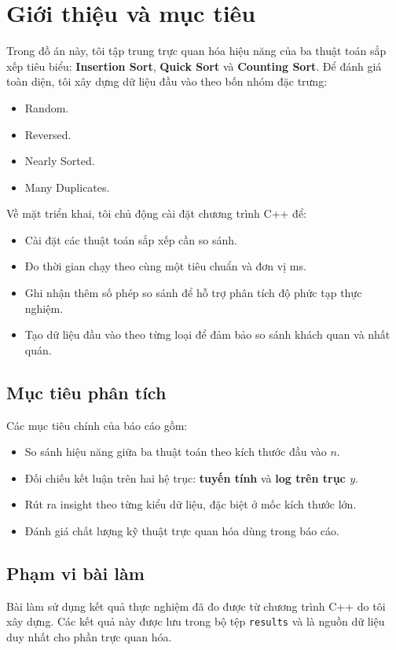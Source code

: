 \section{Giới thiệu và mục tiêu}

Trong đồ án này, tôi tập trung trực quan hóa hiệu năng của ba thuật toán sắp xếp tiêu biểu:
\textbf{Insertion Sort}, \textbf{Quick Sort} và \textbf{Counting Sort}.
Để đánh giá toàn diện, tôi xây dựng dữ liệu đầu vào theo bốn nhóm đặc trưng:
\begin{itemize}[leftmargin=1.2cm]
    \item Random.
    \item Reversed.
    \item Nearly Sorted.
    \item Many Duplicates.
\end{itemize}

Về mặt triển khai, tôi chủ động cài đặt chương trình C++ để:
\begin{itemize}[leftmargin=1.2cm]
    \item Cài đặt các thuật toán sắp xếp cần so sánh.
    \item Đo thời gian chạy theo cùng một tiêu chuẩn và đơn vị ms.
    \item Ghi nhận thêm số phép so sánh để hỗ trợ phân tích độ phức tạp thực nghiệm.
    \item Tạo dữ liệu đầu vào theo từng loại để đảm bảo so sánh khách quan và nhất quán.
\end{itemize}

\subsection{Mục tiêu phân tích}

Các mục tiêu chính của báo cáo gồm:
\begin{itemize}[leftmargin=1.2cm]
    \item So sánh hiệu năng giữa ba thuật toán theo kích thước đầu vào $n$.
    \item Đối chiếu kết luận trên hai hệ trục: \textbf{tuyến tính} và \textbf{log trên trục $y$}.
    \item Rút ra insight theo từng kiểu dữ liệu, đặc biệt ở mốc kích thước lớn.
    \item Đánh giá chất lượng kỹ thuật trực quan hóa dùng trong báo cáo.
\end{itemize}

\subsection{Phạm vi bài làm}

Bài làm sử dụng kết quả thực nghiệm đã đo được từ chương trình C++ do tôi xây dựng.
Các kết quả này được lưu trong bộ tệp \texttt{results} và là nguồn dữ liệu duy nhất cho phần trực quan hóa.
